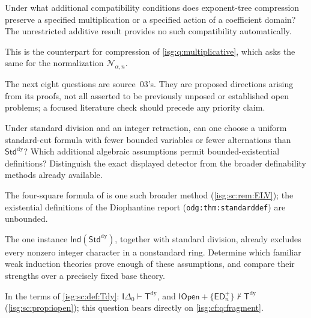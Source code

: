 \documentclass[11pt]{article}
\theoremstyle{definition}
\theoremstyle{remark}
\newcommand{\Rect}{\mathcal{N}_{\alpha,n}}
\newcommand{\StdDy}{\mathsf{Std}^{\mathrm{dy}}}
\newcommand{\Tdy}{\mathsf{T}^{\mathrm{dy}}}
\newcommand{\Ind}{\mathsf{Ind}}
\newcommand{\ED}{\mathsf{ED}}
\newcommand{\Iopen}{\mathsf{IOpen}}
\newcommand{\Idelta}{\mathsf{I}\Delta_0}
\newcommand{\replabel}[1]{\nolinkurl{#1}}
\begin{document}
\begin{question}\label{isg:cf:q:multiplicative}
Under what additional compatibility conditions does exponent-tree
compression preserve a specified multiplication or a specified action
of a coefficient domain? The unrestricted additive result provides no
such compatibility automatically.
\end{question}
This is the counterpart for compression of \cref{isg:q:multiplicative},
which asks the same for the normalization $\Rect$.

The next eight questions are source~03's. They are proposed directions
arising from its proofs, not all asserted to be previously unposed or
established open problems; a focused literature check should precede any
priority claim.

\begin{question}\label{isg:sc:q:detector}
Under standard division and an integer retraction, can one choose a
uniform standard-cut formula with fewer bounded variables or fewer
alternations than $\StdDy$? Which additional algebraic assumptions permit
bounded-existential definitions? Distinguish the exact displayed detector
from the broader definability methods already available.
\end{question}
The four-square formula of \cite[Theorem~2.9]{ELV} is one such broader
method (\cref{isg:sc:rem:ELV}); the existential definitions of the
Diophantine report (\replabel{odg:thm:standarddef}) are unbounded.

\begin{question}\label{isg:sc:q:threshold}
The one instance $\Ind(\StdDy)$, together with standard division, already
excludes every nonzero integer character in a nonstandard ring. Determine
which familiar weak induction theories prove enough of these assumptions,
and compare their strengths over a precisely fixed base theory.
\end{question}
In the terms of \cref{isg:sc:def:Tdy}: $\Idelta\vdash\Tdy$, and
$\Iopen+\{\ED_n^+\}\nvdash\Tdy$ (\cref{isg:sc:prop:iopen}); this question
bears directly on \cref{isg:cf:q:fragment}.
\end{document}
